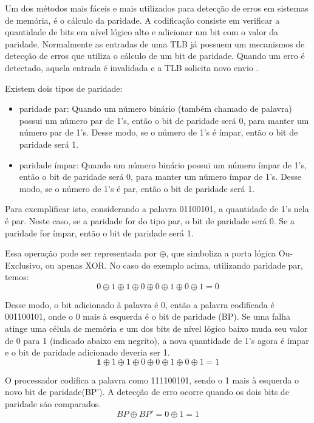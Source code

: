 Um dos métodos mais fáceis e mais utilizados para detecção de erros em sistemas de memória, é o cálculo da paridade. A codificação consiste em verificar a quantidade de bits em nível lógico alto e adicionar um bit com o valor da paridade. Normalmente as entradas de uma TLB já possuem um mecanismos de detecção de erros que utiliza o cálculo de um bit de paridade. Quando um erro é detectado, aquela entrada é invalidada e a TLB solicita novo envio \cite{griffith2005tlb}.

Existem dois tipos de paridade: 

\begin{itemize}
    \item paridade par: Quando um número binário (também chamado de palavra) possui um número par de 1's, então o bit de paridade será 0, para manter um número par de 1's. Desse modo, se o número de 1's é ímpar, então o bit de paridade será 1.
    \item paridade ímpar: Quando um número binário possui um número ímpar de 1's, então o bit de paridade será 0, para manter um número ímpar de 1's. Desse modo, se o número de 1's é par, então o bit de paridade será 1.
\end{itemize}

Para exemplificar isto, considerando a palavra 01100101, a quantidade de 1's nela é par. Neste caso, se a paridade for do tipo par, o bit de paridade será 0. Se a paridade for ímpar, então o bit de paridade será 1.

Essa operação pode ser representada por $\oplus$, que simboliza a porta lógica Ou-Exclusivo, ou apenas XOR. No caso do exemplo acima, utilizando paridade par, temos:
\begin{equation}
    0 \oplus 1 \oplus 1 \oplus 0 \oplus 0 \oplus 1 \oplus 0 \oplus 1 = 0
\end{equation}

Desse modo, o bit adicionado à palavra é 0, então a palavra codificada é 001100101, onde o 0 mais à esquerda é o bit de paridade (BP).
Se uma falha atinge uma célula de memória e um dos bits de nível lógico baixo muda seu valor de 0 para 1 (indicado abaixo em negrito), a nova quantidade de 1's agora é ímpar e o bit de paridade adicionado deveria ser 1.
\begin{equation}
    \textbf{1} \oplus 1 \oplus 1 \oplus 0 \oplus 0 \oplus 1 \oplus 0 \oplus 1 = 1
\end{equation}
    
O processador codifica a palavra como 111100101, sendo o 1 mais à esquerda o novo bit de paridade(BP'). A detecção de erro ocorre quando os dois bits de paridade são comparados.
\begin{equation}
    BP \oplus BP' = 0 \oplus 1 = 1
\end{equation}


